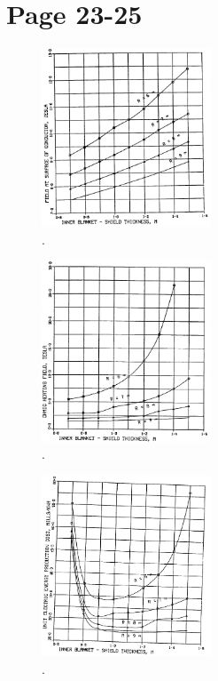 \documentclass[11pt]{report} %
\begin{document}
\section{Page 23-25}
\begin{figure}[H]
  \centering
  \includegraphics[width=0.45\textwidth]{figs/fieldAtSurfaceOfConductor.png}
  \caption{.}
\end{figure}
\begin{figure}[H]
  \centering
  \includegraphics[width=0.45\textwidth]{figs/ohmicHeating.png}
  \caption{.}
\end{figure}
\begin{figure}[H]
  \centering
  \includegraphics[width=0.45\textwidth]{figs/cost.png}
  \caption{.}
\end{figure}
\end{document}
